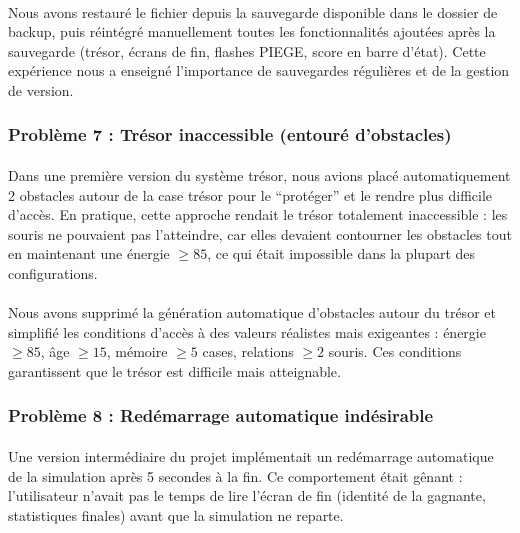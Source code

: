 \paragraph{} Nous avons restauré le fichier depuis la sauvegarde disponible dans le dossier de backup, puis réintégré manuellement toutes les fonctionnalités ajoutées après la sauvegarde (trésor, écrans de fin, flashes PIEGE, score en barre d'état). Cette expérience nous a enseigné l'importance de sauvegardes régulières et de la gestion de version.

\subsubsection{Problème 7 : Trésor inaccessible (entouré d'obstacles)}

\paragraph{} Dans une première version du système trésor, nous avions placé automatiquement 2 obstacles autour de la case trésor pour le ``protéger'' et le rendre plus difficile d'accès. En pratique, cette approche rendait le trésor totalement inaccessible : les souris ne pouvaient pas l'atteindre, car elles devaient contourner les obstacles tout en maintenant une énergie $\geq 85$, ce qui était impossible dans la plupart des configurations.

\paragraph{} Nous avons supprimé la génération automatique d'obstacles autour du trésor et simplifié les conditions d'accès à des valeurs réalistes mais exigeantes : énergie $\geq 85$, âge $\geq 15$, mémoire $\geq 5$ cases, relations $\geq 2$ souris. Ces conditions garantissent que le trésor est difficile mais atteignable.

\subsubsection{Problème 8 : Redémarrage automatique indésirable}

\paragraph{} Une version intermédiaire du projet implémentait un redémarrage automatique de la simulation après 5 secondes à la fin. Ce comportement était gênant : l'utilisateur n'avait pas le temps de lire l'écran de fin (identité de la gagnante, statistiques finales) avant que la simulation ne reparte.

